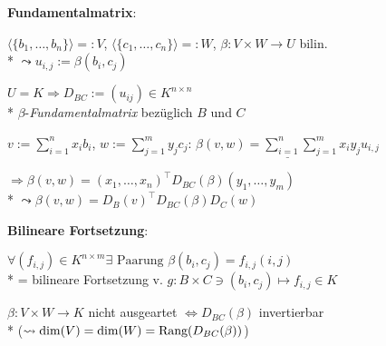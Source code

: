 \textbf{Fundamentalmatrix}:
\begin{items}
	\item \( \langle \{ b_1, \dots, b_n \} \rangle =: V \), \( \langle \{ c_1, \dots, c_n \} \rangle =: W \), \( \beta: V \times W \to U \) bilin.
		\\*
		\( \leadsto u_{i,j} := \beta(b_i, c_j) \)
	\item \( U = K \Rightarrow D_{BC} := (u_{ij}) \in K^{n \times n} \) \\* \( \beta \)-\emph{Fundamentalmatrix} bezüglich \( B \) und \( C \)
	\item \( v := \sum_{i=1}^nx_ib_i \), \( w := \sum_{j=1}^my_jc_j \): \( \underline{\beta(v,w) = \sum_{i=1}^n\sum_{j=1}^mx_iy_ju_{i,j}} \)
	\item \( \Rightarrow \beta(v,w) = (x_1, \dots, x_n)^\top D_{BC}(\beta)(y_1, \dots, y_m) \) 
		\\*
		\( \leadsto \beta(v,w)=D_B(v)^\top D_{BC}(\beta)D_C(w) \) 
\end{items}

\textbf{Bilineare Fortsetzung}:
\begin{items}
	\item \( \forall (f_{i,j}) \in K^{n \times m} \exists \text{ Paarung } \beta(b_i, c_j) = f_{i,j}(i,j) \)
		\\*
		= bilineare Fortsetzung v. \( g: B \times C \ni (b_i,c_j) \mapsto f_{i,j} \in K \)

	\item \( \beta: V \times W \to K \) nicht ausgeartet \( \Leftrightarrow D_{BC}(\beta) \) invertierbar \\*  (\( \leadsto \dim(V) = \dim(W) = \text{Rang}(D_{BC}(\beta)) \))
\end{items}

\newpage